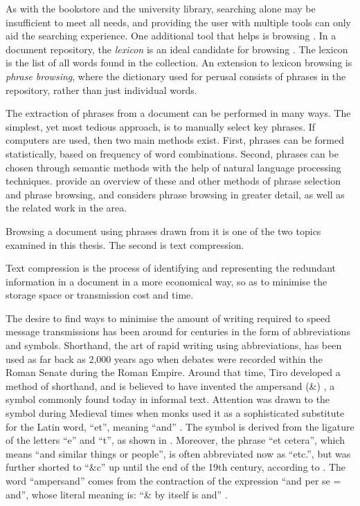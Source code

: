 As with the bookstore and the university library, 
searching alone may be insufficient to meet all needs, and providing
the user with multiple tools can only aid the searching
experience.  One additional tool that helps is browsing
\citep{pf81:irr, br99:book}.  
In a document repository, the {\emph {lexicon}} is an ideal
candidate for browsing \citep{kowalski97:book}.  
The lexicon is the list of all words found
in the collection.  
An extension to lexicon browsing is
{\emph {phrase browsing}}, where the dictionary used for perusal
consists of phrases in the repository, rather than just individual words.

The extraction of phrases from a document can be performed in
many ways.  The simplest, yet most tedious approach, is to manually
select key phrases.  If computers are used, then two main
methods exist.  First, phrases can be formed statistically, based on
frequency of word combinations.  Second, phrases can be chosen 
through semantic methods with the help of natural language processing 
techniques.  \citet{wm01:sigirforum} provide an 
overview of these and other methods of phrase selection and 
phrase browsing, and  considers phrase
browsing in greater detail, as well as the related work in 
the area.

Browsing a document using phrases drawn from it is one of the two
topics examined in this thesis.  The second is text 
compression.


Text compression is the process of identifying and representing
the redundant information in a document in a more economical
way, so as to minimise the storage space or transmission
cost and time.

The desire to find ways to minimise the amount of writing 
required to speed message transmissions
has been around for centuries in the form of 
abbreviations and symbols.  Shorthand, the art of rapid writing using 
abbreviations, has been used as far back as 2,000 years
ago when debates were recorded within the Roman Senate
during the Roman Empire.  Around that time, Tiro 
developed a method of shorthand, and is believed to have 
invented the ampersand (\&) \citep{kreitzman99:jcr}, a symbol 
commonly found today in informal text.
Attention was drawn to the symbol during Medieval times
when monks used it as a
sophisticated substitute for the Latin word,
``et'', meaning ``and'' \citep{todd01:book}.  
The symbol is derived from the ligature of the
letters ``e'' and ``t'', as shown in 
.
Moreover, the phrase ``et cetera'', which means ``and similar
things or people'', is often abbreviated now as ``etc.'', but
was further shorted to ``\&c'' up until the end of the 19th
century, according to \citeauthor{todd01:book}.
The word ``ampersand'' comes from the contraction of the 
expression ``and per se = and'', whose literal meaning 
is:  ``\& by itself is and'' \citep{moore97:book}.

